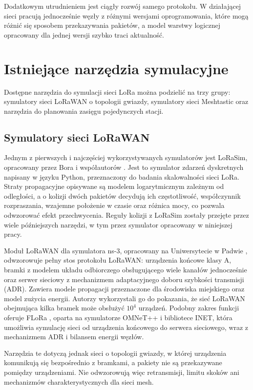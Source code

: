 \documentclass[12pt,a4paper,twoside]{report}
\theoremstyle{definition} %
\begin{document}
Dodatkowym utrudnieniem jest ciągły rozwój samego protokołu. W działającej sieci pracują jednocześnie węzły z różnymi wersjami oprogramowania, które mogą różnić się sposobem przekazywania pakietów, a model warstwy logicznej opracowany dla jednej wersji szybko traci aktualność.

\section{Istniejące narzędzia symulacyjne}

Dostępne narzędzia do symulacji sieci LoRa można podzielić na trzy grupy: symulatory sieci LoRaWAN o topologii gwiazdy, symulatory sieci Meshtastic oraz narzędzia do planowania zasięgu pojedynczych stacji.

\subsection{Symulatory sieci LoRaWAN}

Jednym z pierwszych i najczęściej wykorzystywanych symulatorów jest LoRaSim, opracowany przez Bora i współautorów \cite{bor2016}. Jest to symulator zdarzeń dyskretnych napisany w języku Python, przeznaczony do badania skalowalności sieci LoRa. Straty propagacyjne opisywane są modelem logarytmicznym zależnym od odległości, a o kolizji dwóch pakietów decydują ich częstotliwość, współczynnik rozpraszania, wzajemne położenie w czasie oraz różnica mocy, co pozwala odwzorować efekt przechwycenia. Reguły kolizji z LoRaSim zostały przejęte przez wiele późniejszych narzędzi, w tym przez symulator opracowany w niniejszej pracy.

Moduł LoRaWAN dla symulatora ns-3, opracowany na Uniwersytecie w Padwie \cite{magrin2017}, odwzorowuje pełny stos protokołu LoRaWAN: urządzenia końcowe klasy A, bramki z modelem układu odbiorczego obsługującego wiele kanałów jednocześnie oraz serwer sieciowy z mechanizmem adaptacyjnego doboru szybkości transmisji (ADR). Zawiera modele propagacji przeznaczone dla środowiska miejskiego oraz model zużycia energii. Autorzy wykorzystali go do pokazania, że sieć LoRaWAN obejmująca kilka bramek może obsłużyć \(10^4\) urządzeń. Podobny zakres funkcji oferuje FLoRa \cite{slabicki2018}, oparta na symulatorze OMNeT++ i bibliotece INET, która umożliwia symulację sieci od urządzenia końcowego do serwera sieciowego, wraz z mechanizmem ADR i bilansem energii węzłów.

Narzędzia te dotyczą jednak sieci o topologii gwiazdy, w której urządzenia komunikują się bezpośrednio z bramkami, a pakiety nie są przekazywane pomiędzy urządzeniami. Nie odwzorowują więc retransmisji, limitu skoków ani mechanizmów charakterystycznych dla sieci mesh.
\end{document}
